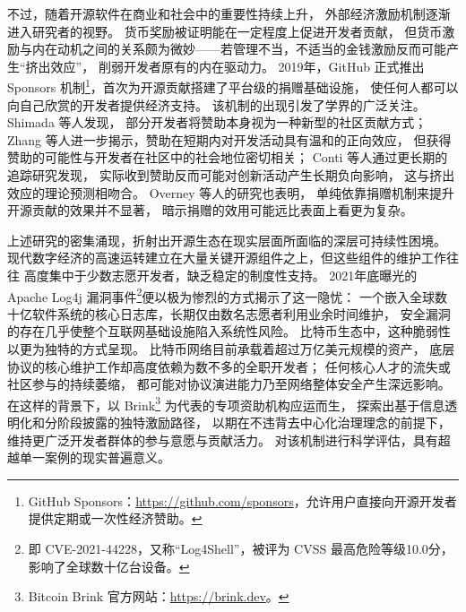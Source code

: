 不过，随着开源软件在商业和社会中的重要性持续上升，
外部经济激励机制逐渐进入研究者的视野。
货币奖励被证明能在一定程度上促进开发者贡献\cite{wang2022monetary}，
但货币激励与内在动机之间的关系颇为微妙——若管理不当，不适当的金钱激励反而可能产生“挤出效应”，
削弱开发者原有的内在驱动力\cite{benabou2003intrinsic,qiao2021mitigating}。
2019年，GitHub 正式推出 Sponsors 机制\footnote{GitHub Sponsors：\url{https://github.com/sponsors}，允许用户直接向开源开发者提供定期或一次性经济赞助。}，首次为开源贡献搭建了平台级的捐赠基础设施，
使任何人都可以向自己欣赏的开发者提供经济支持。
该机制的出现引发了学界的广泛关注。
Shimada 等人\cite{shimada2022github}发现，
部分开发者将赞助本身视为一种新型的社区贡献方式；
Zhang 等人\cite{zhang2022who}进一步揭示，赞助在短期内对开发活动具有温和的正向效应，
但获得赞助的可能性与开发者在社区中的社会地位密切相关；
Conti 等人\cite{conti2023incentivizing}通过更长期的追踪研究发现，
实际收到赞助反而可能对创新活动产生长期负向影响，
这与挤出效应的理论预测相吻合。
Overney 等人\cite{overney2020not}的研究也表明，
单纯依靠捐赠机制来提升开源贡献的效果并不显著，
暗示捐赠的效用可能远比表面上看更为复杂。

上述研究的密集涌现，折射出开源生态在现实层面所面临的深层可持续性困境。
现代数字经济的高速运转建立在大量关键开源组件之上，但这些组件的维护工作往往
高度集中于少数志愿开发者，缺乏稳定的制度性支持。
2021年底曝光的 Apache Log4j 漏洞事件\footnote{即 CVE-2021-44228，又称“Log4Shell”，被评为 CVSS 最高危险等级10.0分，影响了全球数十亿台设备。}便以极为惨烈的方式揭示了这一隐忧：
一个嵌入全球数十亿软件系统的核心日志库，长期仅由数名志愿者利用业余时间维护，
安全漏洞的存在几乎使整个互联网基础设施陷入系统性风险\cite{alami2024sustainability}。
比特币生态中，这种脆弱性以更为独特的方式呈现。
比特币网络目前承载着超过万亿美元规模的资产，
底层协议的核心维护工作却高度依赖为数不多的全职开发者；
任何核心人才的流失或社区参与的持续萎缩，
都可能对协议演进能力乃至网络整体安全产生深远影响。
在这样的背景下，以 Brink\footnote{Bitcoin Brink 官方网站：\url{https://brink.dev}。} 为代表的专项资助机构应运而生，
探索出基于信息透明化和分阶段披露的独特激励路径，
以期在不违背去中心化治理理念的前提下，维持更广泛开发者群体的参与意愿与贡献活力\cite{wu2024governance}。
对该机制进行科学评估，具有超越单一案例的现实普遍意义。

